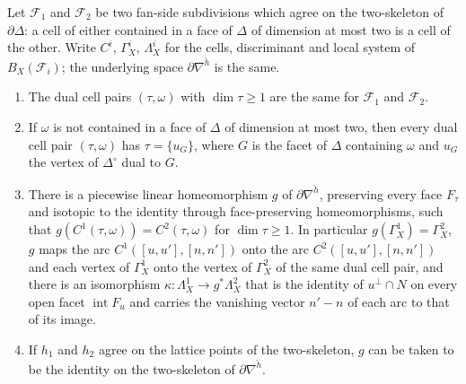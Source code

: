 \begin{proposition}\label{prop:F}
Let $\mathcal F_1$ and $\mathcal F_2$ be two fan-side subdivisions which agree on the two-skeleton of $\partial\Delta$: a cell of either
contained in a face of $\Delta$ of dimension at most two is a cell of the other. Write $C^i$, $\Gamma^i_X$, $\Lambda^i_X$ for
the cells, discriminant and local system of $B_X(\mathcal F_i)$; the underlying space $\partial\nabla^{\check h}$ is the
same.
\begin{enumerate}
\item The dual cell pairs $(\tau,\omega)$ with $\dim\tau\ge1$ are the same for $\mathcal F_1$ and $\mathcal F_2$.
\item If $\omega$ is not contained in a face of $\Delta$ of dimension at most two, then every dual cell pair $(\tau,\omega)$ has
$\tau=\{u_G\}$, where $G$ is the facet of $\Delta$ containing $\omega$ and $u_G$ the vertex of $\Delta^\circ$ dual to $G$.
\item There is a piecewise linear homeomorphism $g$ of $\partial\nabla^{\check h}$, preserving every face $F_\tau$ and
isotopic to the identity through face-preserving homeomorphisms, such that $g(C^1(\tau,\omega))=C^2(\tau,\omega)$
for $\dim\tau\ge1$. In particular $g(\Gamma^1_X)=\Gamma^2_X$, $g$ maps the arc $C^1([u,u'],[n,n'])$ onto the arc
$C^2([u,u'],[n,n'])$ and each vertex of $\Gamma^1_X$ onto the vertex of $\Gamma^2_X$ of the same dual cell pair, and there is an
isomorphism $\kappa\colon\Lambda^1_X\to g^*\Lambda^2_X$ that is the identity of $u^\perp\cap N$ on every open facet
$\operatorname{int}F_u$ and carries the vanishing vector $n'-n$ of each arc to that of its image.
\item If $h_1$ and $h_2$ agree on the lattice points of the two-skeleton, $g$ can be taken to be the identity on the
two-skeleton of $\partial\nabla^{\check h}$.
\end{enumerate}
\end{proposition}
